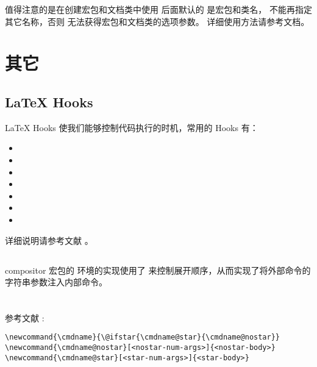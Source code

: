 值得注意的是在创建宏包和文档类中使用  后面默认的 是宏包和类名，
不能再指定其它名称，否则  无法获得宏包和文档类的选项参数。
详细使用方法请参考文档。

\section{其它}

\subsection{{\LaTeX} Hooks}

{\LaTeX} Hooks 使我们能够控制代码执行的时机，常用的 Hooks 有：

\begin{itemize}
  \item {}
  \item {}
  \item {}
  \item {}
  \item {}
  \item {}
  \item {}
\end{itemize}

详细说明请参考文献 \cite{HOOKS}。

\subsection{\protect{}}

compositor 宏包的  环境的实现使用了
 来控制展开顺序，从而实现了将外部命令的字符串参数注入内部命令。

\section{\protect{}}

参考文献 \cite{MANUAL}:

\begin{verbatim}
\newcommand{\cmdname}{\@ifstar{\cmdname@star}{\cmdname@nostar}}
\newcommand{\cmdname@nostar}[<nostar-num-args>]{<nostar-body>} 
\newcommand{\cmdname@star}[<star-num-args>]{<star-body>}
\end{verbatim}

